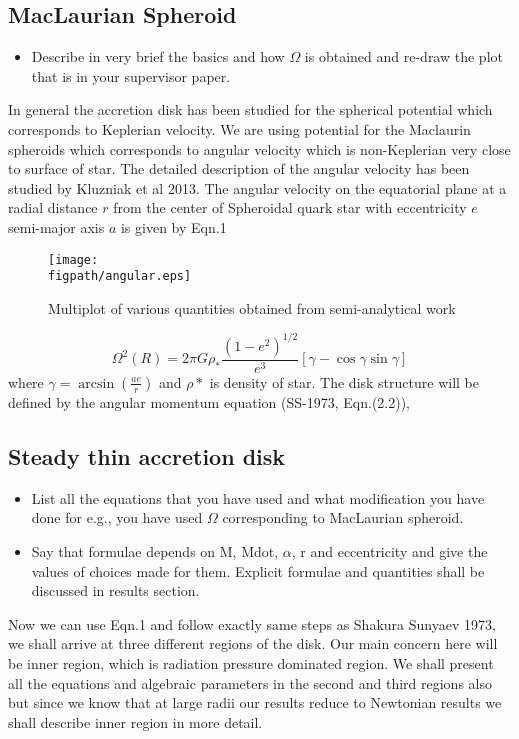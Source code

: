 \documentclass[useAMS,usenatbib]{mn2e}
\newcommand{\figpath}{./Figs/}
\begin{document}
\subsection{MacLaurian Spheroid}
\begin{itemize}
\item Describe in very brief the basics and how $\Omega$ is obtained
  and re-draw the plot that is in your supervisor paper. 
\end{itemize}
In general the accretion disk has been studied for the spherical potential which corresponds to Keplerian velocity. We are using potential for the Maclaurin spheroids which corresponds to angular velocity which is non-Keplerian very close to surface of star. The detailed description of the angular velocity has been studied by Kluzniak et al 2013. The angular velocity on the equatorial plane at a radial distance $r$ from the center of Spheroidal quark star with eccentricity $e$ semi-major axis $a$ is given by Eqn.1
\begin{figure}
\centering
\texttt{[image: \\figpath/angular.eps]}
\caption{Multiplot of various quantities obtained from semi-analytical
  work}
\label{fig:steadyplt1}
\end{figure}
\begin{equation}
\Omega ^2 \left(R\right)= 2\pi G\rho_* \frac{(1-e^2)^{1/2}}{e^3}\left[\gamma - \cos \gamma \sin\gamma \right]
\end{equation}  
where $\gamma = \arcsin (\frac{a e}{r})$ and $\rho *$ is density of star.
The disk structure will be defined by the angular momentum equation (SS-1973, Eqn.(2.2)),
\subsection{Steady thin accretion disk}
\begin{itemize}
\item List all the equations that you have used and what modification
  you have done for e.g., you have used $\Omega$ corresponding to
  MacLaurian spheroid. 
\item Say that formulae depends on M, Mdot, $\alpha$, r and
  eccentricity and give the values of choices made for them. 
  Explicit formulae and quantities shall be discussed in results
  section.
\end{itemize}
Now we can use Eqn.1 and follow exactly same steps as Shakura Sunyaev 1973, we shall arrive at three different regions of the disk. Our main concern here will be inner region, which is radiation pressure dominated region. We shall present all the equations and algebraic parameters in the second and third regions also but since we know that at large radii our results reduce to Newtonian results we shall describe inner region in more detail.
\end{document}
